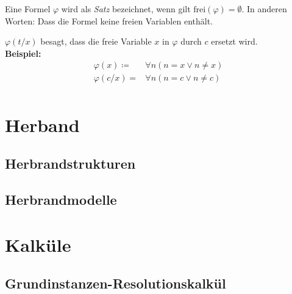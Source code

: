 \documentclass[a4paper, 11pt, accentcolor = tud3b]{tudreport}
\begin{document}
\begin{description}
\begin{description}
                    \end{description}
                \item[Sätze] Eine Formel $ \varphi $ wird als \textit{Satz} bezeichnet, wenn gilt $ \text{frei}(\varphi) = \emptyset $. In anderen Worten: Dass die Formel keine freien Variablen enthält.
                \item $ \varphi(t / x) $ besagt, dass die freie Variable $ x $ in $ \varphi $ durch $ c $ ersetzt wird. \\
                    \textbf{Beispiel:}
                    \begin{align*}
                        \varphi(x) \coloneqq& \forall n (n = x \lor n \neq x) \\
                        \varphi(c / x) =& \forall n (n = c \lor n \neq c) \\
                    \end{align*}
            \end{description}

        \section{Herband}
            \subsection{Herbrandstrukturen}

            \subsection{Herbrandmodelle}

        \section{Kalküle}
            \subsection{Grundinstanzen-Resolutionskalkül}
\end{document}
